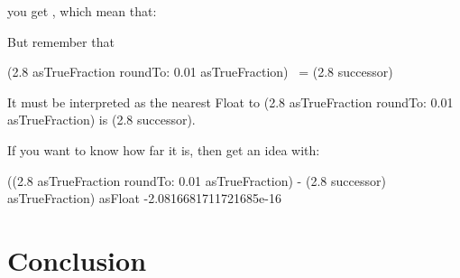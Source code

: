 \documentclass[a4paper,10pt,twoside]{book}
\begin{document}
you get , which mean that:

But remember that 

\begin{code}{}
(2.8 asTrueFraction roundTo: 0.01 asTrueFraction) ~= (2.8 successor)
\end{code}

It must be interpreted as the nearest Float to (2.8 asTrueFraction
roundTo: 0.01 asTrueFraction) is (2.8 successor).

If you want to know how far it is, then get an idea with:

\begin{code}{}
((2.8 asTrueFraction roundTo: 0.01 asTrueFraction) - (2.8 successor)
asTrueFraction) asFloat
-2.0816681711721685e-16
\end{code}



\section{Conclusion}



\ifx\wholebook\relax\else
   
   
\end{document}
